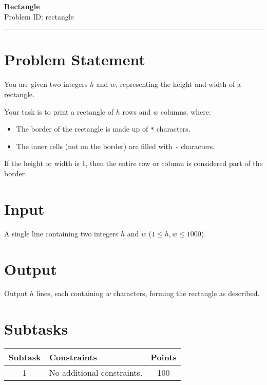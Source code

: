 \documentclass[12pt,a4paper]{article}
\begin{document}
\ifdefined\BOOKLET
  \pagestyle{empty}
\fi

\begin{center}
    {\LARGE \textbf{Rectangle}} \\[0.5em]
    {Problem ID: rectangle} \\[1em]
    \rule{\textwidth}{0.4pt}
\end{center}

\vspace{1em}

\section*{Problem Statement}
You are given two integers $h$ and $w$, representing the height and width of a rectangle.  

Your task is to print a rectangle of $h$ rows and $w$ columns, where:
\begin{itemize}
  \item The border of the rectangle is made up of \texttt{*} characters.  
  \item The inner cells (not on the border) are filled with \texttt{-} characters.  
\end{itemize}

If the height or width is $1$, then the entire row or column is considered part of the border.

\section*{Input}
A single line containing two integers $h$ and $w$ ($1 \leq h, w \leq 1000$).

\section*{Output}
Output $h$ lines, each containing $w$ characters, forming the rectangle as described.

\section*{Subtasks}
\begin{center}
\begin{tabularx}{\textwidth}{|c|X|c|}
\hline
\textbf{Subtask} & \textbf{Constraints} & \textbf{Points} \\
\hline
1 & No additional constraints. & 100 \\
\hline
\end{tabularx}
\end{center}
\end{document}
